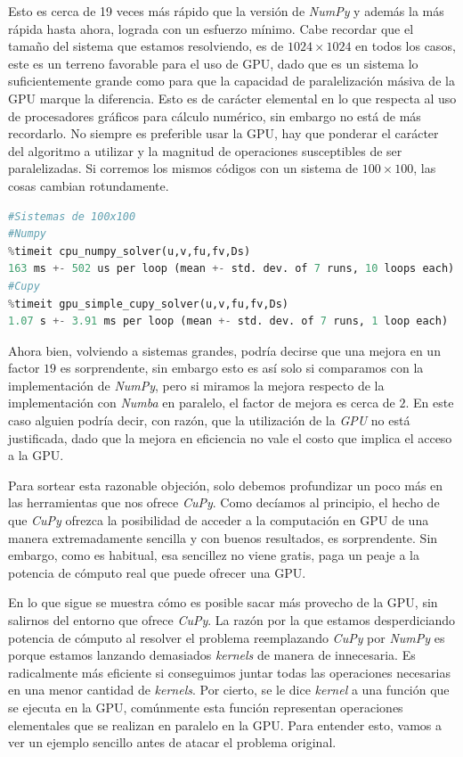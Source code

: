 Esto es cerca de 19 veces más rápido que la versión de \textit{NumPy} y además la más rápida hasta ahora, lograda con un esfuerzo mínimo. Cabe recordar que 
el tamaño del sistema que estamos resolviendo, es de $1024\times1024$ en todos los casos, este es un terreno favorable para el uso de GPU, dado que 
es un sistema lo suficientemente grande como para que la capacidad de paralelización másiva de la GPU marque la diferencia. Esto es de carácter elemental 
en lo que respecta al uso de procesadores gráficos para cálculo numérico, sin embargo no está de más recordarlo. No siempre es preferible usar la GPU,
hay que ponderar el carácter del algoritmo a utilizar y la magnitud de operaciones susceptibles de ser paralelizadas. Si corremos los mismos códigos 
con un sistema de $100\times100$, las cosas cambian rotundamente.
\begin{lstlisting}[language=Python,label = {lst:cupy}]
#Sistemas de 100x100
#Numpy
%timeit cpu_numpy_solver(u,v,fu,fv,Ds)
163 ms +- 502 us per loop (mean +- std. dev. of 7 runs, 10 loops each)
#Cupy
%timeit gpu_simple_cupy_solver(u,v,fu,fv,Ds)
1.07 s +- 3.91 ms per loop (mean +- std. dev. of 7 runs, 1 loop each)
\end{lstlisting}

Ahora bien, volviendo a sistemas grandes, podría decirse que una mejora en un factor $19$ es sorprendente, sin embargo esto es así solo si comparamos
con la implementación de \textit{NumPy}, pero si miramos la mejora respecto de la implementación con \textit{Numba} en paralelo, el factor de 
mejora es cerca de $2$. En este caso alguien podría decir, con razón, que la utilización de la \textit{GPU} no está justificada, dado que la 
mejora en eficiencia no vale el costo que implica el acceso a la GPU.  

Para sortear esta razonable objeción, solo debemos profundizar un poco más en las herramientas que nos ofrece \textit{CuPy}. Como decíamos al principio, 
el hecho de que \textit{CuPy} ofrezca la posibilidad de acceder a la computación en GPU de una manera extremadamente sencilla y con buenos resultados, es 
sorprendente. Sin embargo, como es habitual, esa sencillez no viene gratis, paga un peaje a la potencia de cómputo real que puede ofrecer una GPU. 

En lo que sigue se muestra cómo es posible sacar más provecho de la GPU, sin salirnos del entorno que ofrece \textit{CuPy}. La razón por la que estamos 
desperdiciando potencia de cómputo al resolver el problema reemplazando \textit{CuPy} por \textit{NumPy} es porque estamos lanzando demasiados 
\textit{kernels} de manera de innecesaria. Es radicalmente más eficiente si conseguimos juntar todas las operaciones necesarias en una menor 
cantidad de \textit{kernels}. Por cierto, se le dice \textit{kernel} a una función que se ejecuta en la GPU, comúnmente esta función 
representan operaciones elementales que se realizan en paralelo en la GPU. Para entender esto, vamos a ver un ejemplo sencillo antes de atacar el 
problema original.

